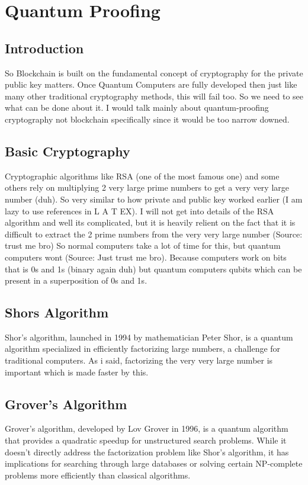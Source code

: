 \documentclass[12pt, a4paper]{article}
\begin{document}
\section{Quantum Proofing}
\subsection{Introduction}
So Blockchain is built on the fundamental concept of cryptography for the private public key matters. Once Quantum Computers are fully developed then just like many other traditional cryptography methods, this will fail too. So we need to see what can be done about it. I would talk mainly about quantum-proofing cryptography not blockchain specifically since it would be too narrow downed.
\subsection{Basic Cryptography}
Cryptographic algorithms like RSA (one of the most famous one) and some others rely on multiplying 2 very large prime numbers to get a very very large number (duh). So very similar to how private and public key worked earlier (I am lazy to use references in L A T EX). I will not get into details of the RSA algorithm and well its complicated, but it is heavily relient on the fact that it is difficult to extract the 2 prime numbers from the very very large number (Source: trust me bro) So normal computers take a lot of time for this, but quantum computers wont (Source: Just trust me bro). Because computers work on bits that is 0s and 1s (binary again duh) but quantum computers qubits which can be present in a superposition of 0s and 1s.
\subsection{Shors Algorithm}
Shor’s algorithm, launched in 1994 by mathematician Peter Shor, is a quantum algorithm specialized in efficiently factorizing large numbers, a challenge for traditional computers. As i said, factorizing the very very large number is important which is made faster by this.
\subsection{Grover’s Algorithm}
Grover's algorithm, developed by Lov Grover in 1996, is a quantum algorithm that provides a quadratic speedup for unstructured search problems. While it doesn't directly address the factorization problem like Shor's algorithm, it has implications for searching through large databases or solving certain NP-complete problems more efficiently than classical algorithms.
\end{document}

